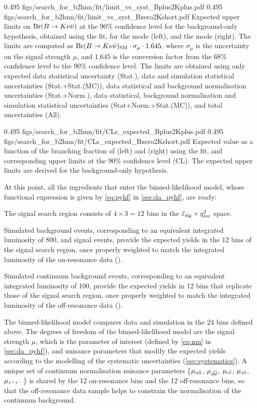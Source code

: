 {0.495}
{figs/search_for_b2hnn/fit/limit_vs_syst_Bplus2Kplus.pdf}
{0.495}
{figs/search_for_b2hnn/fit/limit_vs_syst_Bzero2Kshort.pdf}
{
Expected upper limits on $\mathrm{Br}(B\rightarrow K\nu\bar{\nu})$ at the 90\% confidence level for the background-only hypothesis, obtained using the \sghf fit, for the \BKpnn mode (left), and the \BKznn mode (right).
The limits are computed as $\mathrm{Br}(B\rightarrow K\nu\bar{\nu})_{\mathrm{SM}}\cdot\sigma_{\mu}\cdot1.645$, where $\sigma_{\mu}$ is the uncertainty on the signal strength $\mu$, and $1.645$ is the conversion factor from the $68\%$ confidence level to the $90\%$ confidence level.
The limits are obtained using only expected data statistical uncertainty (Stat.), data and simulation statistical uncertainties (Stat.+Stat.(MC)), data statistical and background normalisation uncertainties (Stat.+Norm.), data statistical, background normalisation and simulation statistical uncertainties (Stat+Norm.+Stat.(MC)), and total uncertainties (All).
}

{0.495}
{figs/search_for_b2hnn/fit/CLs_expected_Bplus2Kplus.pdf}
{0.495}
{figs/search_for_b2hnn/fit/CLs_expected_Bzero2Kshort.pdf}
{
Expected \CLs value as a function of the branching fraction of \BKpnn (left) and \BKznn (right) using the \pyhf fit, and corresponding upper limits at the 90\% confidence level (CL).
The expected upper limits are derived for the background-only hypothesis.
}

At this point, all the ingredients that enter the binned-likelihood model, whose functional expression is given by \cref{eq:pyhf} in \cref{sec:da_pyhf}, are ready:
\bi
\item The signal search region consists of $4\times3=12$ bins in the $\tilde{\varepsilon}_{\mathrm{sig}}\times q_{\mathrm{rec}}^2$ space.
\item Simulated background events, corresponding to an equivalent integrated luminosity of 800\invfb, and \nsignalmctest signal events, provide the expected yields in the 12 bins of the signal search region, once properly weighted to match the integrated luminosity of the on-resonance data (\lumion).
\item Simulated continuum background events, corresponding to an equivalent integrated luminosity of 100\invfb, provide the expected yields in 12 bins that replicate those of the signal search region, once properly weighted to match the integrated luminosity of the off-resonance data (\lumioff).
\item The binned-likelihood model compares data and simulation in the 24 bins defined above.
\ei
The degrees of freedom of the binned-likelihood model are the signal strength $\mu$, which is the parameter of interest (defined by \cref{eq:mu} in \cref{sec:da_pyhf}), and nuisance parameters that modify the expected yields according to the modelling of the systematic uncertainties (\cref{sec:systematics}).
A unique set of continuum normalisation nuisance parameters \{$\mu_{u\overline u}$, $\mu_{d\overline d}$, $\mu_{c\overline c}$, $\mu_{s\overline s}$, $\mu_{\tau^+\tau^-}$\} is shared by the 12 on-resonance bins and the 12 off-resonance bins, so that the off-resonance data sample helps to constrain the normalisation of the continuum background.

